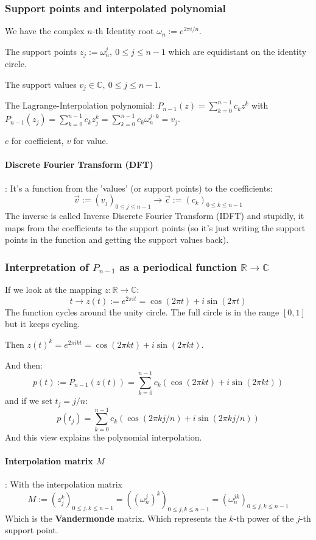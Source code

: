 \documentclass{article}
\begin{document}
\subsubsection{Support points and interpolated polynomial}
We have the complex $n$-th Identity root $\omega_n := e^{2\pi i /n}$.

The support points $z_j := \omega_n^{j} , \ 0 \leq j \leq n-1$ which are equidistant on the identity circle.

The support values $v_j \in \mathbb{C}, \ 0 \leq j \leq n-1$.

The Lagrange-Interpolation polynomial: $P_{n-1}(z) = \sum_{k=0}^{n-1}c_kz^k$ with $P_{n-1}(z_j) = \sum_{k=0}^{n-1} c_kz_j^k = \sum_{k=0}^{n-1}c_k\omega_n^{j\cdot k} = v_j$.

$c$ for coefficient, $v$ for value.

\paragraph{Discrete Fourier Transform (DFT)}: It's a function from the 'values' (or support points) to the coefficients:
\[\vec{v} := (v_j)_{0\leq j\leq n-1} \longrightarrow \vec{c} := (c_k)_{0\leq k \leq n-1}\]
The inverse is called Inverse Discrete Fourier Transform (IDFT) and stupidly, it maps from the coefficients to the support points (so it's just writing the support points in the function and getting the support values back).

\subsubsection{Interpretation of $P_{n-1}$ as a periodical function $\mathbb{R}\to\mathbb{C}$}
If we look at the mapping $z : \mathbb{R}\to\mathbb{C}$:
\[t\to z(t) := e^{2\pi i t} = \cos(2\pi t) + i\sin(2\pi t)\]
The function cycles around the unity circle. The full circle is in the range $[0,1]$ but it keeps cycling.

Then $z(t)^k = e^{2\pi i k t} = \cos(2\pi k t) + i \sin(2\pi k t)$.

And then:
\[p(t) := P_{n-1}(z(t)) = \sum_{k=0}^{n-1}c_k(\cos(2\pi k t) + i \sin(2\pi kt))\]
and if we set $t_j = j/n$:
\[p(t_j) = \sum_{k=0}^{n-1}c_k(\cos(2\pi k j/n) + i\sin(2\pi kj/n))\]
And this view explains the polynomial interpolation.

\paragraph{Interpolation matrix $M$}: With the interpolation matrix 
\[M := (z_j^k)_{0\leq j,k \leq n-1} = ((\omega_n^j)^k)_{0\leq j,k\leq n-1} = (\omega_n^{jk})_{0\leq j,k \leq n-1}\]
Which is the \textbf{Vandermonde} matrix. Which represents the $k$-th power of the $j$-th support point.
\end{document}
